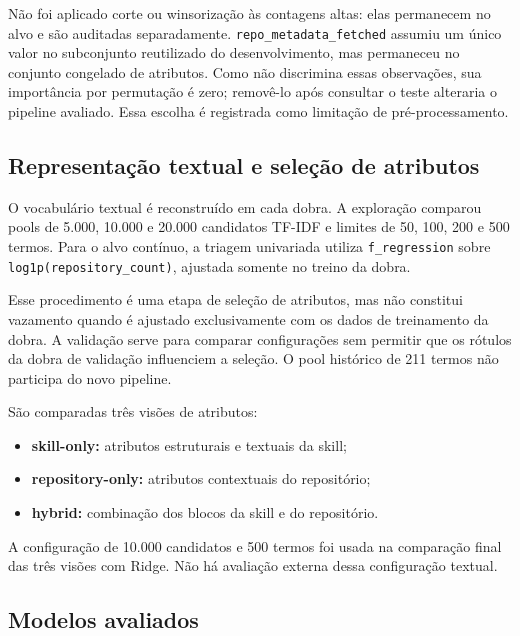 Não foi aplicado corte ou winsorização às contagens altas: elas
permanecem no alvo e são auditadas separadamente.
\texttt{repo\_metadata\_fetched} assumiu um único valor no subconjunto
reutilizado do desenvolvimento, mas permaneceu no conjunto congelado de
atributos. Como não discrimina essas observações, sua importância por
permutação é zero; removê-lo após consultar o teste alteraria o pipeline
avaliado. Essa escolha é registrada como limitação de pré-processamento.

\subsection{Representação textual e seleção de
atributos}\label{representauxe7uxe3o-textual-e-seleuxe7uxe3o-de-atributos}

O vocabulário textual é reconstruído em cada dobra. A exploração
comparou pools de 5.000, 10.000 e 20.000 candidatos TF-IDF e limites de
50, 100, 200 e 500 termos. Para o alvo contínuo, a triagem univariada
utiliza \texttt{f\_regression} sobre \texttt{log1p(repository\_count)},
ajustada somente no treino da dobra.

Esse procedimento é uma etapa de seleção de atributos, mas não constitui
vazamento quando é ajustado exclusivamente com os dados de treinamento
da dobra. A validação serve para comparar configurações sem permitir que
os rótulos da dobra de validação influenciem a seleção. O pool histórico
de 211 termos não participa do novo pipeline.

São comparadas três visões de atributos:

\begin{itemize}
\tightlist
\item
  \textbf{skill-only:} atributos estruturais e textuais da skill;
\item
  \textbf{repository-only:} atributos contextuais do repositório;
\item
  \textbf{hybrid:} combinação dos blocos da skill e do repositório.
\end{itemize}

A configuração de 10.000 candidatos e 500 termos foi usada na comparação
final das três visões com Ridge. Não há avaliação externa dessa
configuração textual.

\subsection{Modelos avaliados}\label{modelos-avaliados}

